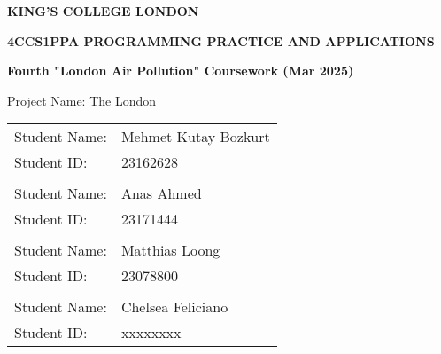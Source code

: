 \documentclass[10pt, a4paper]{scrartcl}
\begin{document}

    \begin{titlepage}
        \begin{center}
            \LARGE
            \textbf{KING'S COLLEGE LONDON}

            \vspace{2cm}

            \begin{adjustwidth}{-1cm}{-1cm}
                \centering
                \Large
                \textbf{4CCS1PPA PROGRAMMING PRACTICE AND APPLICATIONS}
            \end{adjustwidth}

            \vspace{0.5cm}

            \Large
            \textbf{Fourth "London Air Pollution" Coursework (Mar 2025)}

            \vspace{2cm}

            \Large
            Project Name: The London

            \vspace{1cm}

            \Large
            \begin{tabular}{l l}
                Student Name: & Mehmet Kutay Bozkurt \\
                Student ID: & 23162628 \\
                \vspace{0.5cm} & \\
                Student Name: & Anas Ahmed \\
                Student ID: & 23171444 \\
                \vspace{0.5cm} & \\
                Student Name: & Matthias Loong \\
                Student ID: & 23078800 \\
                \vspace{0.5cm} & \\
                Student Name: & Chelsea Feliciano \\
                Student ID: & xxxxxxxx
            \end{tabular}
        \end{center}
    \end{titlepage}
\end{document}
